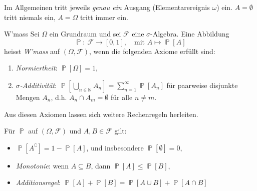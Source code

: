 \documentclass[a4paper,10pt]{article}
\def\N{\mathbb{N}}
\def\F{\mathcal{F}}
\renewcommand{\P}{\operatorname{\mathbb{P}}}
\numberwithin{equation}{section}
\begin{document}
Im Allgemeinen tritt jeweils \emph{genau ein} Ausgang (Elementarereignis \( \omega \)) ein.
\( A = \emptyset \) tritt niemals ein, \( A = \Omega \) tritt immer ein.

\begin{mainbox}{W'mass}
    Sei \( \Omega \) ein Grundraum und sei \( \F \) eine \( \sigma \)-Algebra. Eine Abbildung
    \[
        \P: \: \F \to [0, 1], \quad \text{mit } A \mapsto \P[A]
    \]
    heisst \emph{W'mass} auf \( (\Omega, \F) \), wenn die folgenden Axiome erfüllt sind:
    
    \begin{enumerate}
        \item \emph{Normiertheit}: \( \P[\Omega] = 1 \),
        \item \emph{\( \sigma \)-Additivität}: \( \P \left[ \bigcup_{n \in \N} A_n \right] = \sum_{n = 1}^\infty \P [A_n] \) für paarweise disjunkte Mengen \( A_n \), d.h. \( A_n \cap A_m = \emptyset \) für alle \( n \neq m \).
    \end{enumerate}

\end{mainbox}

Aus diesen Axiomen lassen sich weitere Rechenregeln herleiten.
\begin{subbox}{}
    Für \( \P \) auf \( (\Omega, \F) \) und \( A, B \in \F \) gilt:
    \begin{itemize}
        \item \( \P [A^\complement] = 1 - \P[A] \), und insbesondere \( \P[\emptyset] = 0 \),
        \item \emph{Monotonie}: wenn \( A \subseteq B \), dann \( \P[A] \leq \P[B] \),
        \item \emph{Additionsregel}: \( \P[A] + \P[B] = \P[A \cup B] + \P[A \cap B] \)
    \end{itemize}
\end{subbox}

\end{document}
